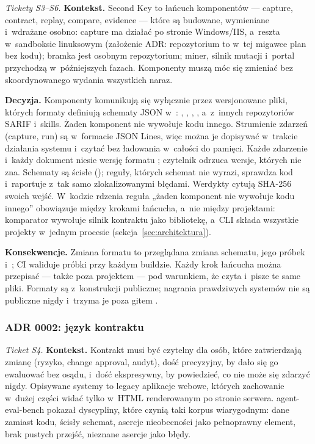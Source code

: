 \emph{Tickety S3–S6.} \textbf{Kontekst.} Second Key to łańcuch komponentów --- capture,
contract, replay, compare, evidence --- które są budowane, wymieniane i~wdrażane osobno:
capture ma działać po stronie Windows/IIS, a~reszta w~sandboksie linuksowym (założenie ADR:
repozytorium  to w~tej migawce plan bez kodu); bramka jest osobnym
repozytorium; miner, silnik mutacji i~portal przychodzą w~późniejszych fazach. Komponenty
muszą móc się zmieniać bez skoordynowanego wydania wszystkich naraz.

\textbf{Decyzja.} Komponenty komunikują się wyłącznie przez wersjonowane pliki, których
formaty definiują schematy JSON w~: ,
, , , a~z~innych
repozytoriów SARIF i~skills. Żaden komponent nie wywołuje kodu innego. Strumienie zdarzeń
(capture, run) są w~formacie JSON Lines, więc można je dopisywać w~trakcie działania systemu
i~czytać bez ładowania w~całości do pamięci. Każde zdarzenie i~każdy dokument niesie wersję
formatu ; czytelnik odrzuca wersje, których nie zna. Schematy są ścisłe
(); reguły, których schemat nie wyrazi, sprawdza kod
i~raportuje z~tak samo zlokalizowanymi błędami. Werdykty cytują SHA-256 swoich wejść. W~kodzie
rdzenia reguła „żaden komponent nie wywołuje kodu innego” obowiązuje między krokami
łańcucha, a~nie między projektami: komparator wywołuje silnik kontraktu jako bibliotekę,
a~CLI składa wszystkie projekty w~jednym procesie (sekcja~\ref{sec:architektura}).

\textbf{Konsekwencje.} Zmiana formatu to przeglądana zmiana schematu, jego próbek i~; CI waliduje próbki przy każdym buildzie. Każdy krok łańcucha
można przepisać --- także poza projektem --- pod warunkiem, że czyta i~pisze te same
pliki. Formaty są z~konstrukcji publiczne; nagrania prawdziwych systemów nie są publiczne
nigdy i~trzyma je poza gitem .

\subsubsection{ADR 0002: język kontraktu}

\emph{Ticket S4.} \textbf{Kontekst.} Kontrakt musi być czytelny dla osób, które zatwierdzają
zmianę (ryzyko, change approval, audyt), dość precyzyjny, by dało się go ewaluować bez
osądu, i~dość ekspresywny, by powiedzieć, co nie może się zdarzyć nigdy. Opisywane systemy
to legacy aplikacje webowe, których zachowanie w~dużej części widać tylko w~HTML
renderowanym po stronie serwera. agent-eval-bench pokazał dyscypliny, które czynią taki
korpus wiarygodnym: dane zamiast kodu, ścisły schemat, asercje nieobecności jako
pełnoprawny element, brak pustych przejść, nieznane asercje jako błędy.

